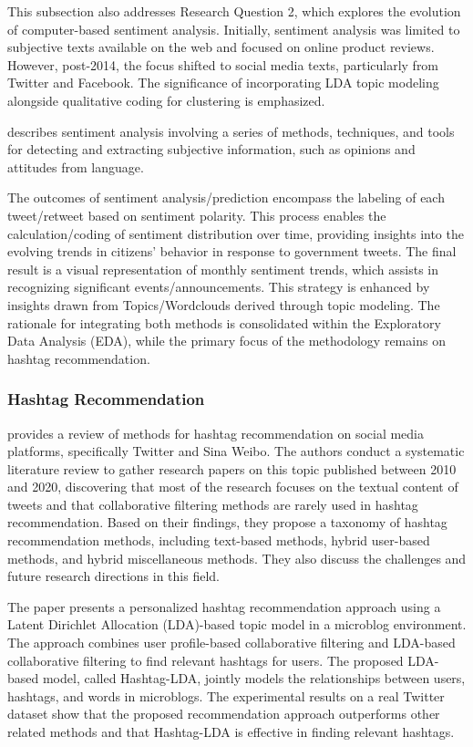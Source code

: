 This subsection also addresses Research Question 2, which explores the evolution of computer-based sentiment analysis. Initially, sentiment analysis was limited to subjective texts available on the web and focused on online product reviews. However, post-2014, the focus shifted to social media texts, particularly from Twitter and Facebook. The significance of incorporating LDA topic modeling alongside qualitative coding for clustering is emphasized.

\cite{liu2010sentiment} describes sentiment analysis involving a series of methods, techniques, and tools for detecting and extracting subjective information, such as opinions and attitudes from language.

The outcomes of sentiment analysis/prediction encompass the labeling of each tweet/retweet based on sentiment polarity. This process enables the calculation/coding of sentiment distribution over time, providing insights into the evolving trends in citizens' behavior in response to government tweets. The final result is a visual representation of monthly sentiment trends, which assists in recognizing significant events/announcements. This strategy is enhanced by insights drawn from Topics/Wordclouds derived through topic modeling. The rationale for integrating both methods is consolidated within the Exploratory Data Analysis (EDA), while the primary focus of the methodology remains on hashtag recommendation.

\subsubsection{Hashtag Recommendation}

\cite{alsini2021hashtag} provides a review of methods for hashtag recommendation on social media platforms, specifically Twitter and Sina Weibo. The authors conduct a systematic literature review to gather research papers on this topic published between 2010 and 2020, discovering that most of the research focuses on the textual content of tweets and that collaborative filtering methods are rarely used in hashtag recommendation. Based on their findings, they propose a taxonomy of hashtag recommendation methods, including text-based methods, hybrid user-based methods, and hybrid miscellaneous methods. They also discuss the challenges and future research directions in this field.

\cite{zhao2016personalized} The paper presents a personalized hashtag recommendation approach using a Latent Dirichlet Allocation (LDA)-based topic model in a microblog environment. The approach combines user profile-based collaborative filtering and LDA-based collaborative filtering to find relevant hashtags for users. The proposed LDA-based model, called Hashtag-LDA, jointly models the relationships between users, hashtags, and words in microblogs. The experimental results on a real Twitter dataset show that the proposed recommendation approach outperforms other related methods and that Hashtag-LDA is effective in finding relevant hashtags.

